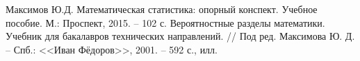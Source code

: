 \documentclass[a4paper,12pt]{article} %
\begin{document}
	
	\tableofcontents \newpage
	\listoffigures \newpage
	
	
	\begin{thebibliography}{99}
		 Максимов Ю.Д. Математическая статистика: опорный конспект. Учебное пособие. М.: Проспект, 2015. -- 102 с.
		 Вероятностные разделы математики. Учебник для бакалавров технических направлений. // Под ред. Максимова Ю. Д. -- Спб.: <<Иван Фёдоров>>, 2001. -- 592 с., илл.
	\end{thebibliography}
\end{document}
